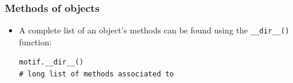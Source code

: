 \documentclass[xcolor=table]{beamer}
\begin{document}
\begin{frame}[fragile]
\frametitle{Methods of objects}

\begin{itemize}\addtolength{\itemsep}{0.5\baselineskip}
    \item A complete list of an object's methods can be found using the \texttt{\_\_dir\_\_()} function:
\begin{lstlisting}[style=python]
motif.__dir__()
# long list of methods associated to 
\end{lstlisting} 
\end{itemize}
\end{frame}

\end{document}
